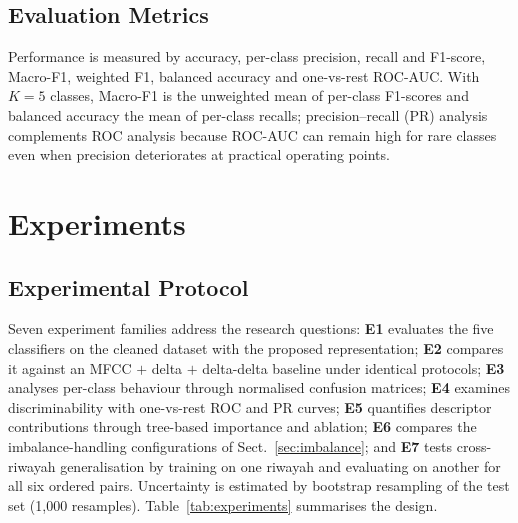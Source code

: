 \documentclass[runningheads]{llncs}
\begin{document}
\subsection{Evaluation Metrics}
\label{sec:metrics}

Performance is measured by accuracy, per-class precision, recall and F1-score,
Macro-F1, weighted F1, balanced accuracy and one-vs-rest ROC-AUC. With $K=5$
classes, Macro-F1 is the unweighted mean of per-class F1-scores and balanced
accuracy the mean of per-class recalls; precision--recall (PR) analysis
complements ROC analysis because ROC-AUC can remain high for rare classes even
when precision deteriorates at practical operating points.


\section{Experiments}
\label{sec:experiments}

\subsection{Experimental Protocol}

Seven experiment families address the research questions: \textbf{E1} evaluates
the five classifiers on the cleaned dataset with the proposed representation;
\textbf{E2} compares it against an MFCC $+$ delta $+$ delta-delta baseline under
identical protocols; \textbf{E3} analyses per-class behaviour through normalised
confusion matrices; \textbf{E4} examines discriminability with one-vs-rest ROC
and PR curves; \textbf{E5} quantifies descriptor contributions through
tree-based importance and ablation; \textbf{E6} compares the imbalance-handling
configurations of Sect.~\ref{sec:imbalance}; and \textbf{E7} tests cross-riwayah
generalisation by training on one riwayah and evaluating on another for all six
ordered pairs. Uncertainty is estimated by bootstrap resampling of the test set
(1{,}000 resamples). Table~\ref{tab:experiments} summarises the design.
\end{document}
